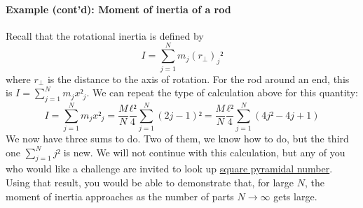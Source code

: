 \paragraph{Example (cont'd): Moment of inertia of a rod}
Recall that the rotational inertia is defined by 
$$
I= \sum_{j=1}^N m_j (r_{⟂})_j² 
$$
where $r_⟂$ is the distance to the axis of rotation. For the rod around an end, this is $I =  \sum_{j=1}^N m_j x²_j$. We can repeat the type of calculation above for this quantity:
$$
I =  \sum_{j=1}^N m_j x²_j
	= \frac M{N} \frac {ℓ²} 4 \sum_{j=1}^N  (2j-1)² 	
	= \frac M{N} \frac {ℓ²} 4 \sum_{j=1}^N  (4j² - 4 j + 1)
$$
We now have three sums to do. Two of them, we know how to do, but the third one $\sum_{j=1}^N  j²$ is new. We will not continue with this calculation, but any of you who would like a challenge are invited to look up \href{https://en.wikipedia.org/wiki/Square_pyramidal_number}{square pyramidal number}. 
Using that result, you would be able to demonstrate that, for large $N$, the moment of inertia approaches 
as the number of parts $N→ ∞$ gets large.

